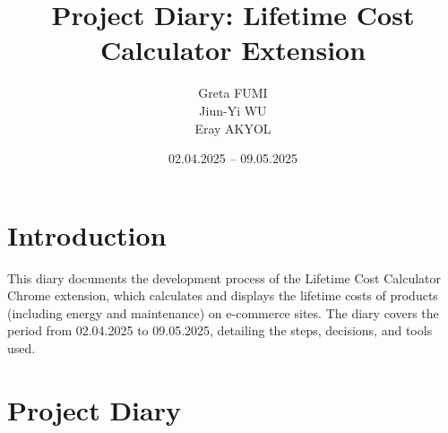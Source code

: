 \documentclass{article}
\title{Project Diary: Lifetime Cost Calculator Extension}
\author{Greta FUMI \\ Jiun-Yi WU \\ Eray AKYOL}
\date{02.04.2025 -- 09.05.2025}
\begin{document}
\maketitle

\section*{Introduction}
This diary documents the development process of the Lifetime Cost Calculator Chrome extension, which calculates and displays the lifetime costs of products (including energy and maintenance) on e-commerce sites. The diary covers the period from 02.04.2025 to 09.05.2025, detailing the steps, decisions, and tools used.

\section*{Project Diary}
\end{document}

